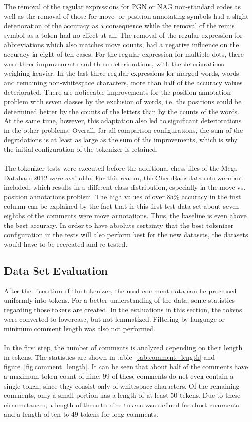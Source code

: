 \documentclass[article,type=msc,colorback,accentcolor=tud7b]{tudthesis}
\begin{document}
    The removal of the regular expressions for PGN or NAG non-standard codes as well as the removal of those for move- or position-annotating symbols had a slight deterioration of the accuracy as a consequence while the removal of the remis symbol as a token had no effect at all. The removal of the regular expression for abbreviations which also matches move counts, had a negative influence on the accuracy in eight of ten cases. For the regular expression for multiple dots, there were three improvements and three deteriorations, with the deteriorations weighing heavier. In the last three regular expressions for merged words, words and remaining non-whitespace characters, more than half of the accuracy values deteriorated. There are noticeable improvements for the position annotation problem with seven classes by the exclusion of words, i.e. the positions could be determined better by the counts of the letters than by the counts of the words. At the same time, however, this adaptation also led to significant deteriorations in the other problems. Overall, for all comparison configurations, the sum of the degradations is at least as large as the sum of the improvements, which is why the initial configuration of the tokenizer is retained. \\\\
    The tokenizer tests were executed before the additional chess files of the Mega Database 2012 were available. For this reason, the ChessBase data sets were not included, which results in a different class distribution, especially in the move vs. position annotations problem. The high values of over 85\% accuracy in the first column can be explained by the fact that in this first test data set about seven eighths of the comments were move annotations. Thus, the baseline is even above the best accuracy. In order to have absolute certainty that the best tokenizer configuration in the tests will also perform best for the new datasets, the datasets would have to be recreated and re-tested.
 
  \subsection{Data Set Evaluation}    
    After the discretion of the tokenizer, the used comment data can be processed uniformly into tokens. For a better understanding of the data, some statistics regarding those tokens are created. In the evaluations in this section, the tokens were converted to lowercase, but not lemmatized. Filtering by language or minimum comment length was also not performed. \\\\
    In the first step, the number of comments is analyzed depending on their length in tokens. The statistics are shown in table~\ref{tab:comment_length} and figure~\ref{fig:comment_length}. It can be seen that about half of the comments have a maximum token count of nine. 99 of these comments do not even contain a single token, since they consist only of whitespace characters. Of the remaining comments, only a small portion has a length of at least 50 tokens. Due to these circumstances, a length of three to nine tokens was defined for short comments and a length of ten to 49 tokens for long comments.
\end{document}
